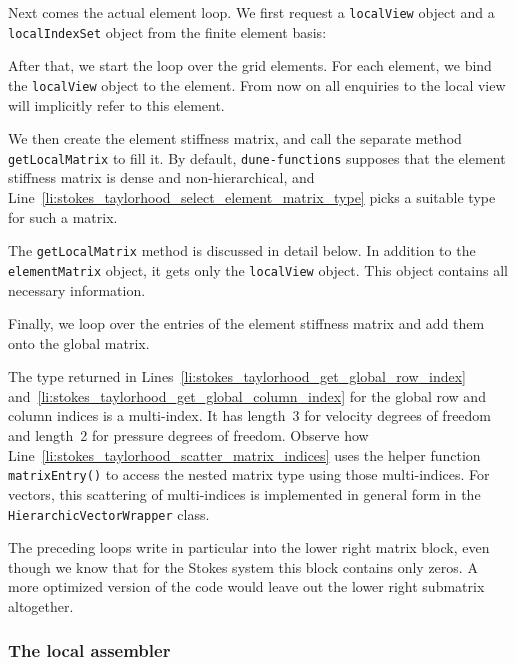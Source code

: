 \documentclass[a4paper,10pt,headings=normal,bibliography=totoc]{scrartcl}
\newcommand{\cpp}[1]{\lstinline[basicstyle=\ttfamily]!#1!}
\newcommand{\dunemodule}[1]{\texttt{#1}}
\begin{document}
Next comes the actual element loop.  We first request a \cpp{localView} object and a \cpp{localIndexSet} object
from the finite element basis:
%

%
After that, we start the loop over the grid elements.  For each element, we bind the \cpp{localView} object
to the element.
From now on all enquiries to the local view will implicitly refer to this element.
%

%
We then create the element stiffness matrix, and call the separate method \cpp{getLocalMatrix} to fill it.
By default, \dunemodule{dune-functions} supposes that the element stiffness matrix is dense and non-hierarchical,
and Line~\ref{li:stokes_taylorhood_select_element_matrix_type}
picks a suitable type for such a matrix.
%

%
The \cpp{getLocalMatrix} method is discussed in detail below.
In addition to the \cpp{elementMatrix} object, it gets only the \cpp{localView} object.  This object contains
all necessary information.

Finally, we loop over the entries of the element stiffness matrix and add them onto the global matrix.
%

%
The type returned in Lines~\ref{li:stokes_taylorhood_get_global_row_index} and~\ref{li:stokes_taylorhood_get_global_column_index}
for the global row and column indices is a multi-index.  It has length~3 for velocity degrees of freedom and
length~2 for pressure degrees of freedom.
Observe how Line~\ref{li:stokes_taylorhood_scatter_matrix_indices} uses the helper function
\cpp{matrixEntry()} to access the nested matrix type using those multi-indices.
For vectors, this scattering of multi-indices is implemented
in general form in the \cpp{HierarchicVectorWrapper} class.

The preceding loops write in particular into the lower right matrix block, even though we know that for the Stokes
system this block contains only zeros.  A more optimized version of the code would leave out the lower right
submatrix altogether.

\subsubsection{The local assembler}
\end{document}
